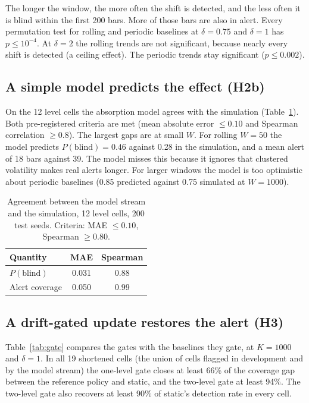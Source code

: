 \documentclass[11pt]{article}
\begin{document}
The longer the window, the more often the shift is detected, and the less often it is blind within the first 200 bars. More of those bars are also in alert. Every permutation test for rolling and periodic baselines at $\delta=0.75$ and $\delta=1$ has $p\le 10^{-4}$. At $\delta=2$ the rolling trends are not significant, because nearly every shift is detected (a ceiling effect). The periodic trends stay significant ($p\le0.002$).

\subsection{A simple model predicts the effect (H2b)}

On the 12 level cells the absorption model agrees with the simulation (Table~\ref{tab:model}). Both pre-registered criteria are met (mean absolute error $\le0.10$ and Spearman correlation $\ge0.8$). The largest gaps are at small $W$. For rolling $W=50$ the model predicts $P(\text{blind})=0.46$ against 0.28 in the simulation, and a mean alert of 18 bars against 39. The model misses this because it ignores that clustered volatility makes real alerts longer. For larger windows the model is too optimistic about periodic baselines (0.85 predicted against 0.75 simulated at $W=1000$).

\begin{table}[t]
\centering
\caption{Agreement between the model stream and the simulation, 12 level cells, 200 test seeds. Criteria: MAE $\le0.10$, Spearman $\ge0.80$.}
\label{tab:model}
\begin{tabular}{lcc}
\toprule
Quantity & MAE & Spearman\\
\midrule
$P(\text{blind})$ & 0.031 & 0.88\\
Alert coverage & 0.050 & 0.99\\
\bottomrule
\end{tabular}
\end{table}

\subsection{A drift-gated update restores the alert (H3)}

Table~\ref{tab:gate} compares the gates with the baselines they gate, at $K=1000$ and $\delta=1$. In all 19 shortened cells (the union of cells flagged in development and by the model stream) the one-level gate closes at least 66\% of the coverage gap between the reference policy and static, and the two-level gate at least 94\%. The two-level gate also recovers at least 90\% of static's detection rate in every cell.
\end{document}
